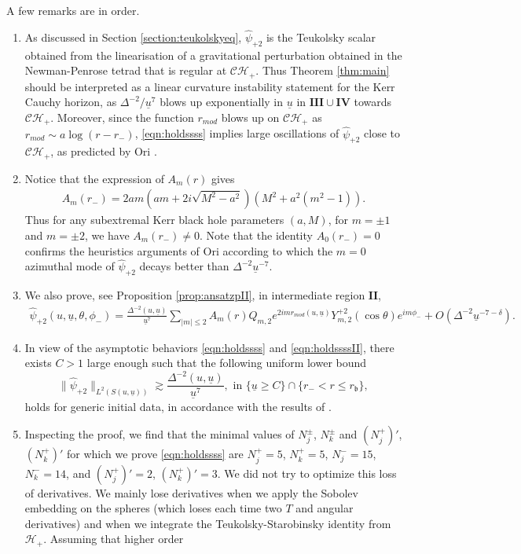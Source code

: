 \documentclass[reqno]{amsart}
\numberwithin{equation}{section}
\newcommand{\quatre}{\mathbf{IV}}
\newcommand{\mch}{\mathcal{H}}
\newcommand{\ubar}{{\underline{u}}}
\newcommand{\ch}{\mathcal{CH_+}}
\newcommand{\Psihat}{\widehat{\psi}}
\newcommand{\psihat}{\widehat{\psi}}
\newcommand{\deux}{\mathbf{II}}
\newcommand{\trois}{\mathbf{III}}
\newcommand{\rb}{r_\mathfrak{b}}
\newcommand{\Psihatp}{\Psihat_{+2}}
\newcommand{\psihatp}{\psihat_{+2}}
\theoremstyle{plain}
\theoremstyle{definition}
\theoremstyle{remark}
\numberwithin{equation}{section}
\begin{document}
\begin{rem}\label{rem:apresthm}
    A few remarks are in order.
    \begin{enumerate}
        \item As discussed in Section \ref{section:teukolskyeq}, $\psihatp$ is the Teukolsky scalar obtained from the linearisation of a gravitational perturbation obtained in the Newman-Penrose tetrad that is regular at $\ch$. Thus Theorem \ref{thm:main} should be interpreted as a linear curvature instability statement for the Kerr Cauchy horizon, as $\Delta^{-2}/\ubar^7$ blows up exponentially in $\ubar$ in $\trois\cup\quatre$ towards $\ch$. Moreover, since the function $r_{mod}$ blows up on $\ch$ as $r_{mod}\sim a\log(r-r_-)$, \eqref{eqn:holdssss} implies large oscillations of $\psihatp$ close to $\ch$, as predicted by Ori \cite{ori}.
        \item Notice that the expression of $A_m(r)$ gives
        \begin{align}\label{eq:am(r-)}
            A_m(r_-)=2am\left(am+2i\sqrt{M^2-a^2}\right)\left(M^2+a^2(m^2-1)\right).
        \end{align}
        Thus for any subextremal Kerr black hole parameters $(a,M)$, for $m=\pm 1$ and $m=\pm 2$, we have $A_m(r_-)\neq 0$. Note that the identity $A_0(r_-)=0$ confirms the heuristics arguments of Ori \cite{ori} according to which the $m=0$ azimuthal mode of $\Psihatp$ decays better than $\Delta^{-2}\ubar^{-7}$. 
        \item We also prove, see Proposition \ref{prop:ansatzpII}, in  intermediate region $\deux$,
\begin{align}\label{eqn:holdssssII}
    \psihatp(u,\ubar,\theta,\phi_{-})=\frac{\Delta^{-2}(u,\ubar)}{\ubar^7}\sum_{|m|\leq 2}A_m(r)Q_{m,2}e^{2imr_{mod}(u,\ubar)}Y_{m,2}^{+2}(\cos\theta)e^{im\phi_{-}}+O(\Delta^{-2}\ubar^{-7-\delta}).
\end{align} 
        \item In view of the asymptotic behaviors \eqref{eqn:holdssss} and  \eqref{eqn:holdssssII}, there exists $C>1$ large enough such that the following uniform lower bound
$$\|\psihatp\|_{L^2(S(u,\ubar))}\gtrsim \frac{\Delta^{-2}(u,\ubar)}{\ubar^7},\text{   in   }\{\ubar\geq C\}\cap \{r_-< r\leq \rb\},$$
        holds for generic initial data, in accordance with the results of \cite{sbierski}.
        \item Inspecting the proof, we find that the minimal values of $N_j^\pm$, $N_k^\pm$ and $(N_j^+)'$, $(N_k^+)'$ for which we prove \eqref{eqn:holdssss} are $N_j^+=5$, $N_k^+=5$, $N_j^-=15$, $N_k^-=14$, and $(N_j^+)'=2$, $(N_k^+)'=3$. We did not try to optimize this loss of derivatives. We mainly lose derivatives when we apply the Sobolev embedding on the spheres (which loses each time two $T$ and angular derivatives) and when we integrate the Teukolsky-Starobinsky identity from $\mch_+$. Assuming that higher order 

\end{enumerate}
\end{rem}
\end{document}
